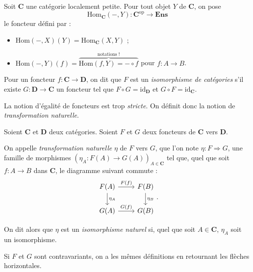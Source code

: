 \begin{exm}
  Soit $\mathbf{C}$ une catégorie localement petite. Pour tout objet $Y$ de $\mathbf{C}$, on pose
  \[ \mathrm{Hom}_\mathbf{C} (-, Y) : \mathbf{C}^\mathrm{op} \to \mathbf{Ens} \]
  le foncteur défini par :
  \begin{itemize}
    \item $\mathrm{Hom}(-, X)(Y) = \mathrm{Hom}_\mathbf{C}(X,Y)$ ;
    \item $\mathrm{Hom}(-, Y)(f) = \overbrace{\mathrm{Hom}(f,Y) = - \circ f}^\text{notations !}$ pour $f : A \to B$.
  \end{itemize}
\end{exm}

\begin{defn}
  Pour un foncteur $f : \mathbf{C} \to \mathbf{D}$, on dit que $F$ est un \textit{isomorphisme de catégories} s'il existe $G : \mathbf{D} \to \mathbf{C}$ un foncteur tel que $F \circ G = \mathrm{id}_\mathbf{D}$ et $G \circ F = \mathrm{id}_\mathbf{C}$.
\end{defn}

La notion d'égalité de foncteurs est trop \textit{stricte}. On définit donc la notion de \textit{transformation naturelle}.

\begin{defn}
  Soient $\mathbf{C}$ et $\mathbf{D}$ deux catégories.
  Soient $F$ et $G$ deux foncteurs de $\mathbf{C}$ vers $\mathbf{D}$.

  On appelle \textit{transformation naturelle} $\eta$ de $F$ vers $G$, que l'on note $\eta : F \Rightarrow G$, une famille de morphismes $(\eta_A : F(A)\to  G(A))_{A \in \mathbf{C}}$ tel que, quel que soit $f : A \to B$ dans $\mathbf{C}$, le diagramme suivant commute :
  \[
  \begin{tikzcd}
    F(A) \arrow{r}{F(f)} \arrow{d}{\eta_A} & F(B) \arrow{d}{\eta_B} \\
    G(A) \arrow{r}{G(f)} & G(B)
  \end{tikzcd}
  .\]

  On dit alors que $\eta$ est un \textit{isomorphisme naturel} si, quel que soit $A \in \mathbf{C}$, $\eta_A$ soit un isomorphisme.

  Si $F$ et $G$ sont contravariants, on a les mêmes définitions en retournant les flèches horizontales.
\end{defn}

